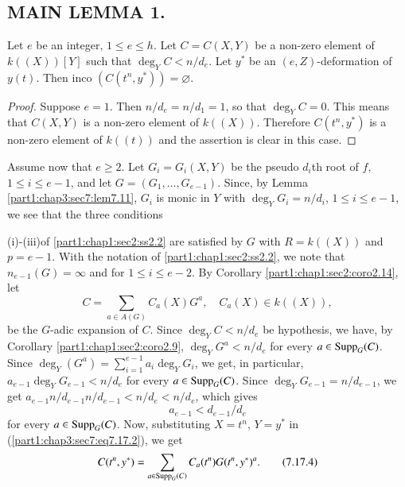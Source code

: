 \setcounter{subsection}{16}
\subsection{\textbf{MAIN LEMMA 1.}}\label{part1:chap3:sec7:ss7.17}
  
Let $e$ be an integer, $1 \leq e \leq h$. Let $C= C(X, Y)$ be a non-zero element of $k((X))[Y]$ such that $\deg_Y C< n/d_e$. Let $y^*$ be an $(e, Z)$-deformation of $y(t)$. Then inco $(C(t^n, y^*))= \diameter$.

\begin{proof}
  Suppose $e=1$. Then $n/d_e= n/d_1=1$, so that $\deg_Y C=0$. This means that $C(X, Y)$ is a non-zero element of $k((X))$. Therefore $C (t^n, y^*)$ is a non-zero element of $k((t))$ and the assertion is clear in this case.
\end{proof}

Assume now that $e\geq 2$. Let $G_i = G_i (X, Y)$ be the pseudo $d_i$th root of $f$, $1 \leq i \leq e-1$, and let $G= (G_1, \ldots, G_{e-1})$. Since, by Lemma \ref{part1:chap3:sec7:lem7.11}, $G_i$ is monic in $Y$ with $\deg_Y G_i = n/d_i$, $1\leq i \leq e-1$, we see that the three conditions

(i)-(iii)\pageoriginale of \ref{part1:chap1:sec2:ss2.2} are satisfied by $G$ with $R= k((X))$ and $p=e-1$. With the notation of \ref{part1:chap1:sec2:ss2.2}, we note that $n_{e-1}(G)= \infty$ and 
for $1\leq i \leq e-2$. By Corollary \ref{part1:chap1:sec2:coro2.14}, let
\begin{equation*}
  C= \sum_{a \in A(G)} C_a (X) G^a, \quad C_a (X) \in k ((X)),\tag{7.17.2} 
  \label{part1:chap3:sec7:eq7.17.2}
\end{equation*}
be the $G$-adic expansion of $C$. Since $\deg_Y C< n/d_e$ be hypothesis, we have, by Corollary \ref{part1:chap1:sec2:coro2.9}, $\deg_Y G^a< n/d_e$ for every $a \in \operatorname{Supp}_G(C)$. Since $\deg_Y (G^a) =\displaystyle{\sum^{e-1}_{i=1}} a_i \deg_Y G_i$, we get, in particular, $a_{e-1} \deg_Y G_{e-1}< n/d_e$ for every $a \in \operatorname{Supp}_G (C)$. Since $\deg_Y G_{e-1}= n/d_{e-1}$, we get $a_{e-1}n/d_{e-1}n/d_{e-1} < n/d_e < n/d_e$, which gives
\begin{equation*}
  a_{e-1} < d_{e-1}/d_e \tag{7.17.3} \label{part1:chap3:sec7:eq7.17.3}
\end{equation*}
for every $a\in \operatorname{Supp}_G (C)$. Now, substituting $X= t^n$, $Y=y^*$ in (\ref{part1:chap3:sec7:eq7.17.2}), we get 
\begin{equation*}
  C(t^n, y^*) = \sum_{a \in \operatorname{Supp}_G (C)} C_a (t^n) G(t^n,
  y^*)^a.\tag{7.17.4} \label{part1:chap3:sec7:eq7.17.4} 
\end{equation*}

